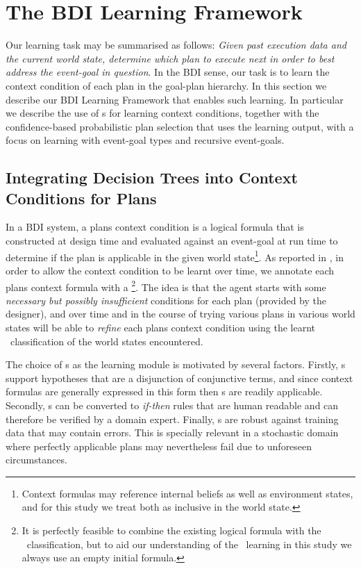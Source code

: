 \section{The BDI Learning Framework}\label{sec:framework}

Our learning task may be summarised as follows: \textit{Given past execution data and the current world state, determine which plan to execute next in order to best address the event-goal in question}. In the BDI sense, our task is to learn the context condition of each plan in the goal-plan hierarchy. In this section we describe our BDI Learning Framework that enables such learning. In particular we describe the use of \dt s for learning context conditions, together with the confidence-based probabilistic plan selection that uses the learning output, with a focus on learning with event-goal types and recursive event-goals.

\subsection{Integrating Decision Trees into Context Conditions for Plans}

In a BDI system, a plans context condition is a logical formula that is constructed at design time and evaluated against an event-goal at run time to determine if the plan is applicable in the given world state\footnote{Context formulas may reference internal beliefs as well as environment states, and for this study we treat both as inclusive in the world state.}. As reported in \cite{Airiau:IJAT:09}, in order to allow the context condition to be learnt over time, we annotate each plans context formula with a \textit{\dt}\footnote{It is perfectly feasible to combine the existing logical formula with the \dt\ classification, but to aid our understanding of the \dt\ learning in this study we always use an empty initial formula.}. The idea is that the agent starts with some \textit{necessary but possibly insufficient} conditions for each plan (provided by the designer), and over time and in the course of trying various plans in various world states will be able to \textit{refine} each plans context condition using the learnt \dt\ classification of the world states encountered.

The choice of \dt s as the learning module is motivated by several factors. Firstly, \dt s support hypotheses that are a disjunction of conjunctive terms, and since context formulas are generally expressed in this form then \dt s are readily applicable. Secondly, \dt s can be converted to \textit{if-then} rules that are human readable and can therefore be verified by a domain expert. Finally, \dt s are robust against training data that may contain errors. This is specially relevant in a stochastic domain where perfectly applicable plans may nevertheless fail due to unforeseen circumstances.

